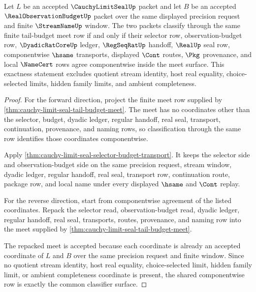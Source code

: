 \begin{theorem}
\label{thm:cauchy-limit-seal-tail-budget-meet-exactness}
Let $L$ be an accepted $\CauchyLimitSealUp$ packet and let $B$ be an accepted $\RealObservationBudgetUp$ packet over the same displayed precision request and finite $\StreamNameUp$ window. The two packets classify through the same finite tail-budget meet row if and only if their selector row, observation-budget row, $\DyadicRatCoreUp$ ledger, $\RegSeqRatUp$ handoff, $\RealUp$ seal row, componentwise $\hsame$ transports, displayed $\Cont$ routes, $\Pkg$ provenance, and local $\NameCert$ rows agree componentwise inside the meet surface. This exactness statement excludes quotient stream identity, host real equality, choice-selected limits, hidden family limits, and ambient completeness.
\end{theorem}
\begin{proof}
For the forward direction, project the finite meet row supplied by \autoref{thm:cauchy-limit-seal-tail-budget-meet}. The meet has no coordinates other than the selector, budget, dyadic ledger, regular handoff, real seal, transport, continuation, provenance, and naming rows, so classification through the same row identifies those coordinates componentwise.

Apply \autoref{thm:cauchy-limit-seal-selector-budget-transport}. It keeps the selector side and observation-budget side on the same precision request, stream window, dyadic ledger, regular handoff, real seal, transport row, continuation route, package row, and local name under every displayed $\hsame$ and $\Cont$ replay.

For the reverse direction, start from componentwise agreement of the listed coordinates. Repack the selector read, observation-budget read, dyadic ledger, regular handoff, real seal, transports, routes, provenance, and naming row into the meet supplied by \autoref{thm:cauchy-limit-seal-tail-budget-meet}.

The repacked meet is accepted because each coordinate is already an accepted coordinate of $L$ and $B$ over the same precision request and finite window. Since no quotient stream identity, host real equality, choice-selected limit, hidden family limit, or ambient completeness coordinate is present, the shared componentwise row is exactly the common classifier surface.
\end{proof}

